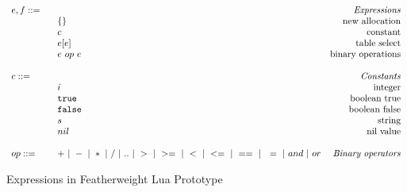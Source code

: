 \documentclass{article}
\newcommand{\rel}[1]{ \mbox{\sc [#1]} }
\begin{document}
\begin{figure}
\caption{Expressions in Featherweight Lua Prototype}
\label{fig:FWLuaExp}
\[
\begin{array}{llr}
  \mydefhead{e,f ::=\qquad\qquad\qquad\qquad}{Expressions}
  \mydefcase{\{\}}{new allocation}
  \mydefcase{c}{constant}
  \mydefcase{e[e]}{table select}
  \mydefcase{e ~op~ e}{binary operations}
  \\
  \mydefhead{c ::=\qquad\qquad\qquad\qquad}{Constants}
  \mydefcase{i}{integer}
  \mydefcase{\tt true}{boolean true}
  \mydefcase{\tt false}{boolean false}
  \mydefcase{s}{string}
  \mydefcase{nil}{nil value}
  \\
  op ::= & + ~|~ - ~|~ * ~|~ / ~|~ .. ~|~ > ~|~ >= ~|~ < ~|~ <= ~|~ == ~|~ ~= ~|~ and ~|~ or & \mbox{\emph{Binary operators}} \\
\end{array}
\]
\end{figure}


\newcommand{\ssrule}[3]{
  \rel{#1} &
  \frac{\strut\begin{array}{@{}c@{}} #2 \end{array}}
       {\strut\begin{array}{@{}c@{}} #3 \end{array}}
   \\~\\
}
\newcommand{\semanticExp}[3]{{#1},{#2} \downarrow {#3}}
\newcommand{\semanticExpRaw}[3]{{#1},{#2} \downarrow {#3}}
\newcommand{\ctxt}{C}
\newcommand{\true}{\mbox{\tt true}}
\newcommand{\false}{\mbox{\tt false}}
\end{document}
